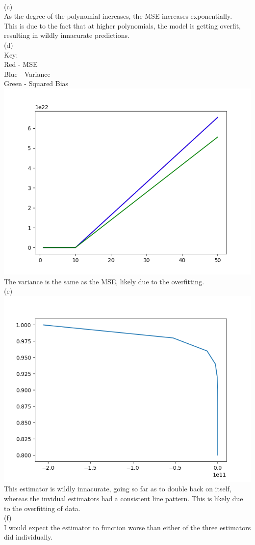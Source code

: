 \documentclass{article}
\begin{document}
\\
(c)\\
As the degree of the polynomial increases, the MSE increases exponentially.\\
This is due to the fact that at higher polynomials, the model is getting overfit, resulting in wildly innacurate predictions.\\
(d)\\
Key:\\
Red - MSE\\
Blue - Variance\\
Green - Squared Bias\\
\includegraphics[scale = 0.75]{3.png}
\\
The variance is the same as the MSE, likely due to the overfitting.\\
(e)\\
\includegraphics[scale = 0.75]{4.png}\\
This estimator is wildly innacurate, going so far as to double back on itself, whereas the invidual estimators had a consistent line pattern. This is likely due to the overfitting of data.\\
(f)\\
I would expect the estimator to function worse than either of the three estimators did individually.
\end{document}
